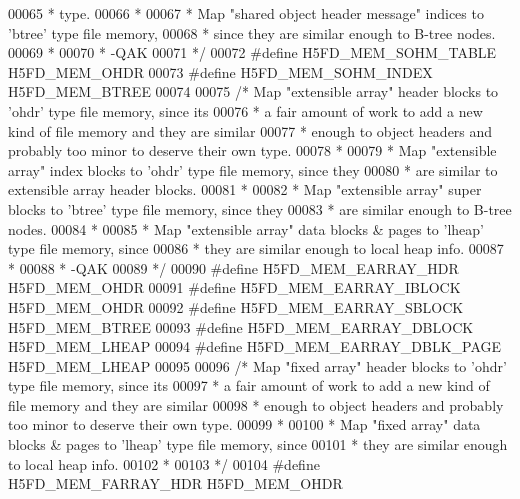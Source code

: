 \begin{DoxyCode}
00065 \textcolor{comment}{ * type.}
00066 \textcolor{comment}{ *}
00067 \textcolor{comment}{ * Map "shared object header message" indices to 'btree' type file memory,}
00068 \textcolor{comment}{ * since they are similar enough to B-tree nodes.}
00069 \textcolor{comment}{ *}
00070 \textcolor{comment}{ *      -QAK}
00071 \textcolor{comment}{ */}
00072 \textcolor{preprocessor}{#define H5FD\_MEM\_SOHM\_TABLE     H5FD\_MEM\_OHDR}
00073 \textcolor{preprocessor}{#define H5FD\_MEM\_SOHM\_INDEX     H5FD\_MEM\_BTREE}
00074 
00075 \textcolor{comment}{/* Map "extensible array" header blocks to 'ohdr' type file memory, since its}
00076 \textcolor{comment}{ * a fair amount of work to add a new kind of file memory and they are similar}
00077 \textcolor{comment}{ * enough to object headers and probably too minor to deserve their own type.}
00078 \textcolor{comment}{ *}
00079 \textcolor{comment}{ * Map "extensible array" index blocks to 'ohdr' type file memory, since they}
00080 \textcolor{comment}{ * are similar to extensible array header blocks.}
00081 \textcolor{comment}{ *}
00082 \textcolor{comment}{ * Map "extensible array" super blocks to 'btree' type file memory, since they}
00083 \textcolor{comment}{ * are similar enough to B-tree nodes.}
00084 \textcolor{comment}{ *}
00085 \textcolor{comment}{ * Map "extensible array" data blocks & pages to 'lheap' type file memory, since}
00086 \textcolor{comment}{ * they are similar enough to local heap info.}
00087 \textcolor{comment}{ *}
00088 \textcolor{comment}{ *      -QAK}
00089 \textcolor{comment}{ */}
00090 \textcolor{preprocessor}{#define H5FD\_MEM\_EARRAY\_HDR     H5FD\_MEM\_OHDR}
00091 \textcolor{preprocessor}{#define H5FD\_MEM\_EARRAY\_IBLOCK  H5FD\_MEM\_OHDR}
00092 \textcolor{preprocessor}{#define H5FD\_MEM\_EARRAY\_SBLOCK  H5FD\_MEM\_BTREE}
00093 \textcolor{preprocessor}{#define H5FD\_MEM\_EARRAY\_DBLOCK  H5FD\_MEM\_LHEAP}
00094 \textcolor{preprocessor}{#define H5FD\_MEM\_EARRAY\_DBLK\_PAGE  H5FD\_MEM\_LHEAP}
00095 
00096 \textcolor{comment}{/* Map "fixed array" header blocks to 'ohdr' type file memory, since its}
00097 \textcolor{comment}{ * a fair amount of work to add a new kind of file memory and they are similar}
00098 \textcolor{comment}{ * enough to object headers and probably too minor to deserve their own type.}
00099 \textcolor{comment}{ *}
00100 \textcolor{comment}{ * Map "fixed array" data blocks & pages to 'lheap' type file memory, since}
00101 \textcolor{comment}{ * they are similar enough to local heap info.}
00102 \textcolor{comment}{ *}
00103 \textcolor{comment}{ */}
00104 \textcolor{preprocessor}{#define H5FD\_MEM\_FARRAY\_HDR     H5FD\_MEM\_OHDR}

\end{DoxyCode}
